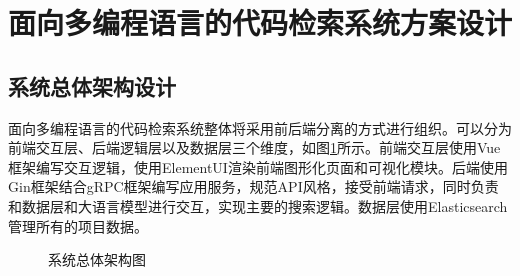 \documentclass[UTF8,a4paper,12pt]{ctexart}
\numberwithin{equation}{section}
\begin{document}
\section{面向多编程语言的代码检索系统方案设计}
\subsection{系统总体架构设计}
面向多编程语言的代码检索系统整体将采用前后端分离的方式进行组织。可以分为前端交互层、后端逻辑层以及数据层三个维度，如图\ref{all_structure}所示。前端交互层使用Vue框架编写交互逻辑，使用ElementUI渲染前端图形化页面和可视化模块。后端使用Gin框架结合gRPC框架编写应用服务，规范API风格，接受前端请求，同时负责和数据层和大语言模型进行交互，实现主要的搜索逻辑。数据层使用Elasticsearch管理所有的项目数据。
\begin{figure}[H]
	\caption{系统总体架构图}
	\label{all_structure}
\end{figure}
\end{document}

